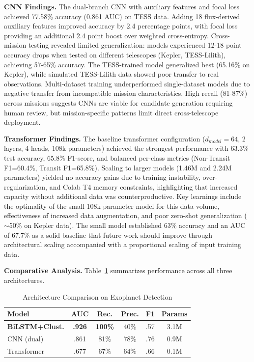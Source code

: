 \documentclass[letterpaper]{article} %
\begin{document}
\textbf{CNN Findings.} The dual-branch CNN with auxiliary features and focal loss achieved 77.58\% accuracy (0.861 AUC) on TESS data. Adding 18 flux-derived auxiliary features improved accuracy by 2.4 percentage points, with focal loss providing an additional 2.4 point boost over weighted cross-entropy. Cross-mission testing revealed limited generalization: models experienced 12-18 point accuracy drops when tested on different telescopes (Kepler, TESS-Lilith), achieving 57-65\% accuracy. The TESS-trained model generalized best (65.16\% on Kepler), while simulated TESS-Lilith data showed poor transfer to real observations. Multi-dataset training underperformed single-dataset models due to negative transfer from incompatible mission characteristics. High recall (81-87\%) across missions suggests CNNs are viable for candidate generation requiring human review, but mission-specific patterns limit direct cross-telescope deployment.

\textbf{Transformer Findings.} The baseline transformer configuration ($d_{model}=64$, 2 layers, 4 heads, 108k parameters) achieved the strongest performance with 63.3\% test accuracy, 65.8\% F1-score, and balanced per-class metrics (Non-Transit F1=60.4\%, Transit F1=65.8\%). Scaling to larger models (1.46M and 2.24M parameters) yielded no accuracy gains due to training instability, over-regularization, and Colab T4 memory constraints, highlighting that increased capacity without additional data was counterproductive. Key learnings include the optimality of the small 108k parameter model for this data volume, effectiveness of increased data augmentation, and poor zero-shot generalization ($\sim$50\% on Kepler data). The small model established 63\% accuracy and an AUC of 67.7\% as a solid baseline that future work should improve through architectural scaling accompanied with a proportional scaling of input training data.

\textbf{Comparative Analysis.} Table~\ref{tab:comparative} summarizes performance across all three architectures.

\begin{table}[h]
\centering
\small
\caption{Architecture Comparison on Exoplanet Detection}
\label{tab:comparative}
\begin{tabular}{@{}lccccc@{}}
\toprule
\textbf{Model} & \textbf{AUC} & \textbf{Rec.} & \textbf{Prec.} & \textbf{F1} & \textbf{Params} \\
\midrule
\textbf{BiLSTM+Clust.} & \textbf{.926} & \textbf{100\%} & 40\% & .57 & 3.1M \\
CNN (dual) & .861 & 81\% & 78\% & .76 & 0.9M \\
Transformer & .677 & 67\% & 64\% & .66 & 0.1M \\
\bottomrule
\end{tabular}
\end{table}
\end{document}
